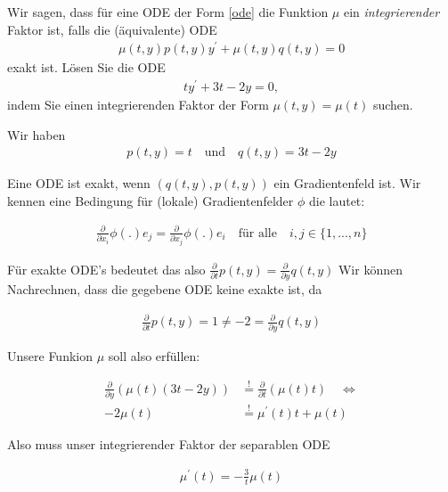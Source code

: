 \begin{exercise}
Wir sagen, dass für eine ODE der Form \eqref{ode} die Funktion $\mu$ ein
\textit{integrierender} Faktor ist, falls die (äquivalente) ODE
\begin{align*}
  \mu(t,y)p(t,y)y^{\prime} + \mu(t,y)q(t,y) = 0
\end{align*}
exakt ist. Lösen Sie die ODE
\begin{align*}
  ty^{\prime} + 3t - 2y = 0,
\end{align*}
indem Sie einen integrierenden Faktor der Form $\mu(t,y) = \mu(t)$ suchen. \\
\end{exercise}
\begin{solution}
  Wir haben
  \begin{align*}
    p(t, y) = t \quad \textrm{und} \quad q(t,y) = 3t - 2y
  \end{align*}

Eine ODE ist exakt, wenn $(q(t,y), p(t,y))$ ein Gradientenfeld ist. Wir kennen eine
Bedingung für (lokale) Gradientenfelder $\phi$ die lautet:

\begin{align*}
  \frac{\partial}{\partial x_i} \phi(.) e_j = \frac{\partial}{\partial x_j} \phi(.) e_i
  \quad \text{für alle} \quad i, j \in \{1,...,n\}
\end{align*}

Für exakte ODE's bedeutet  das also $\frac{\partial}{\partial t} p(t,y) =
\frac{\partial}{\partial y} q(t,y)$
Wir können Nachrechnen, dass die gegebene ODE keine exakte ist, da

  \begin{align*}
    \frac{\partial}{\partial t} p(t,y) = 1 \neq -2 = \frac{\partial}{\partial y} q(t,y)
  \end{align*}

Unsere Funkion $\mu$ soll also erfüllen:

  \begin{align*}
    \frac{\partial}{\partial y} (\mu(t)(3t-2y)) &\stackrel{!}{=}
    \frac{\partial}{\partial t} (\mu(t) t)
    \quad \Leftrightarrow \\
    -2\mu(t) &\stackrel{!}{=} \mu^\prime (t)t+ \mu(t)
   \end{align*}

Also muss unser integrierender Faktor der separablen ODE

\begin{align*}
  \mu^\prime (t) = -\frac{3}{t} \mu(t)
\end{align*}


\end{solution}

